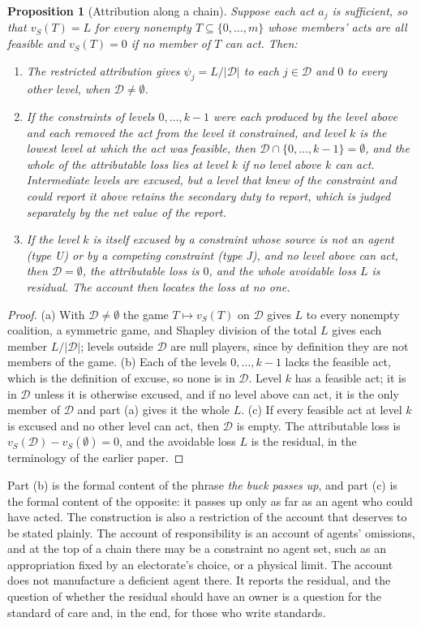 \documentclass[11pt]{article}
\newcommand{\Dfc}{\mathcal D}
\theoremstyle{plain}
\newtheorem{proposition}{Proposition}
\theoremstyle{definition}
\begin{document}
\begin{proposition}[Attribution along a chain]\label{prop:chain}
Suppose each act $a_j$ is sufficient, so that $v_S(T)=L$ for every nonempty $T\subseteq\{0,\dots,m\}$ whose members' acts are all feasible and $v_S(T)=0$ if no member of $T$ can act. Then:
\begin{enumerate}[label=(\alph*),nosep]
\item The restricted attribution gives $\psi_j=L/|\Dfc|$ to each $j\in\Dfc$ and $0$ to every other level, when $\Dfc\neq\emptyset$.
\item If the constraints of levels $0,\dots,k-1$ were each produced by the level above and each removed the act from the level it constrained, and level $k$ is the lowest level at which the act was feasible, then $\Dfc\cap\{0,\dots,k-1\}=\emptyset$, and the whole of the attributable loss lies at level $k$ if no level above $k$ can act. Intermediate levels are excused, but a level that knew of the constraint and could report it above retains the secondary duty to report, which is judged separately by the net value of the report.
\item If the level $k$ is itself excused by a constraint whose source is not an agent (type U) or by a competing constraint (type J), and no level above can act, then $\Dfc=\emptyset$, the attributable loss is $0$, and the whole avoidable loss $L$ is residual. The account then locates the loss at no one.
\end{enumerate}
\end{proposition}

\begin{proof}
(a) With $\Dfc\neq\emptyset$ the game $T\mapsto v_S(T)$ on $\Dfc$ gives $L$ to every nonempty coalition, a symmetric game, and Shapley division of the total $L$ gives each member $L/|\Dfc|$; levels outside $\Dfc$ are null players, since by definition they are not members of the game. (b) Each of the levels $0,\dots,k-1$ lacks the feasible act, which is the definition of excuse, so none is in $\Dfc$. Level $k$ has a feasible act; it is in $\Dfc$ unless it is otherwise excused, and if no level above can act, it is the only member of $\Dfc$ and part (a) gives it the whole $L$. (c) If every feasible act at level $k$ is excused and no other level can act, then $\Dfc$ is empty. The attributable loss is $v_S(\Dfc)-v_S(\emptyset)=0$, and the avoidable loss $L$ is the residual, in the terminology of the earlier paper.
\end{proof}

Part (b) is the formal content of the phrase \emph{the buck passes up}, and part (c) is the formal content of the opposite: it passes up only as far as an agent who could have acted. The construction is also a restriction of the account that deserves to be stated plainly. The account of responsibility is an account of agents' omissions, and at the top of a chain there may be a constraint no agent set, such as an appropriation fixed by an electorate's choice, or a physical limit. The account does not manufacture a deficient agent there. It reports the residual, and the question of whether the residual should have an owner is a question for the standard of care and, in the end, for those who write standards.
\end{document}

